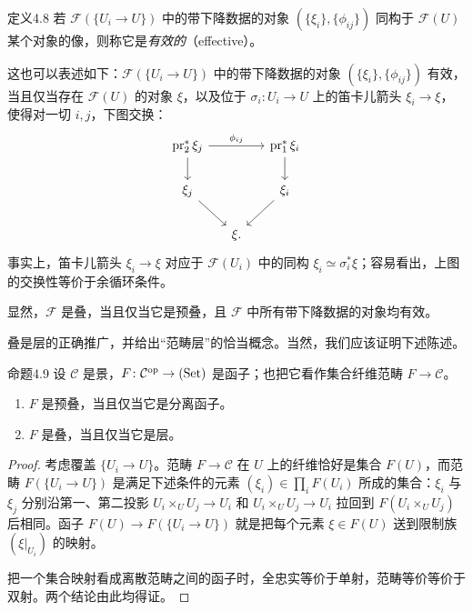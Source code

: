 \begin{origstatement}{定义}{4.8}\label{ch04:def48}
若 $\mathcal F(\{U_i\to U\})$ 中的带下降数据的对象 $(\{\xi_i\},\{\phi_{ij}\})$ 同构于 $\mathcal F(U)$ 某个对象的像，则称它是\emph{有效的}（effective）。
\end{origstatement}

这也可以表述如下：$\mathcal F(\{U_i\to U\})$ 中的带下降数据的对象 $(\{\xi_i\},\{\phi_{ij}\})$ 有效，当且仅当存在 $\mathcal F(U)$ 的对象 $\xi$，以及位于 $\sigma_i\colon U_i\to U$ 上的笛卡儿箭头 $\xi_i\to\xi$，使得对一切 $i,j$，下图交换：
\[
\begin{tikzcd}[column sep=1.4em]
 \operatorname{pr}_2^*\xi_j\arrow[rr,"{\phi_{ij}}"]\arrow[d]&&\operatorname{pr}_1^*\xi_i\arrow[d]\\
 \xi_j\arrow[dr]&&\xi_i\arrow[dl]\\
 &\xi.
\end{tikzcd}
\]
事实上，笛卡儿箭头 $\xi_i\to\xi$ 对应于 $\mathcal F(U_i)$ 中的同构 $\xi_i\simeq\sigma_i^*\xi$；容易看出，上图的交换性等价于余循环条件。

显然，$\mathcal F$ 是叠，当且仅当它是预叠，且 $\mathcal F$ 中所有带下降数据的对象均有效。

叠是层的正确推广，并给出“范畴层”的恰当概念。当然，我们应该证明下述陈述。

\begin{origstatement}{命题}{4.9}\label{ch04:prop49}
设 $\mathcal C$ 是景，$F\colon\mathcal C^{\mathrm{op}}\to(\mathrm{Set})$ 是函子；也把它看作集合纤维范畴 $F\to\mathcal C$。
\begin{enumerate}
 \item[(i)] $F$ 是预叠，当且仅当它是分离函子。
 \item[(ii)] $F$ 是叠，当且仅当它是层。
\end{enumerate}
\end{origstatement}
\begin{proof}
考虑覆盖 $\{U_i\to U\}$。范畴 $F\to\mathcal C$ 在 $U$ 上的纤维恰好是集合 $F(U)$，而范畴 $F(\{U_i\to U\})$ 是满足下述条件的元素 $(\xi_i)\in\prod_i F(U_i)$ 所成的集合：$\xi_i$ 与 $\xi_j$ 分别沿第一、第二投影 $U_i\times_U U_j\to U_i$ 和 $U_i\times_U U_j\to U_i$ 拉回到 $F(U_i\times_U U_j)$ 后相同。函子 $F(U)\to F(\{U_i\to U\})$ 就是把每个元素 $\xi\in F(U)$ 送到限制族 $(\xi|_{U_i})$ 的映射。

把一个集合映射看成离散范畴之间的函子时，全忠实等价于单射，范畴等价等价于双射。两个结论由此均得证。
\end{proof}

